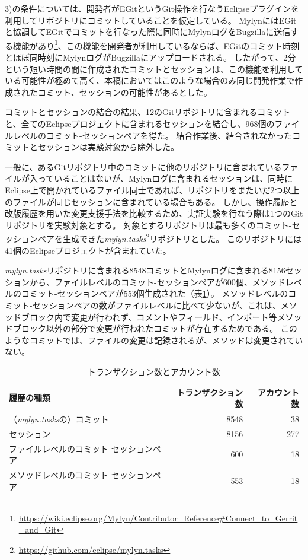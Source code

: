 \documentclass[a4paper]{jsbook}
\begin{document}
3)の条件については、開発者がEGitというGit操作を行なうEclipseプラグインを利用してリポジトリにコミットしていることを仮定している。
MylynにはEGitと協調してEGitでコミットを行なった際に同時にMylynログをBugzillaに送信する機能があり\footnote{\url{https://wiki.eclipse.org/Mylyn/Contributor_Reference\#Connect_to_Gerrit_and_Git}}、この機能を開発者が利用しているならば、EGitのコミット時刻とほぼ同時刻にMylynログがBugzillaにアップロードされる。
したがって、2分という短い時間の間に作成されたコミットとセッションは、この機能を利用している可能性が極めて高く、本稿においてはこのような場合のみ同じ開発作業で作成されたコミット、セッションの可能性があるとした。

コミットとセッションの結合の結果、12のGitリポジトリに含まれるコミットと、全てのEclipseプロジェクトに含まれるセッションを結合し、968個のファイルレベルのコミット-セッションペアを得た。
結合作業後、結合されなかったコミットとセッションは実験対象から除外した。

一般に、あるGitリポジトリ中のコミットに他のリポジトリに含まれているファイルが入っていることはないが、Mylynログに含まれるセッションは、同時にEclipse上で開かれているファイル同士であれば、リポジトリをまたいだ2つ以上のファイルが同じセッションに含まれている場合もある。
しかし、操作履歴と改版履歴を用いた変更支援手法を比較するため、実証実験を行なう際は1つのGitリポジトリを実験対象とする。
対象とするリポジトリは最も多くのコミット-セッションペアを生成できた{\it mylyn.tasks}\footnote{\url{https://github.com/eclipse/mylyn.tasks}}リポジトリとした。
このリポジトリには41個のEclipseプロジェクトが含まれていた。

{\it mylyn.tasks}リポジトリに含まれる8548コミットとMylynログに含まれる8156セッションから、ファイルレベルのコミット-セッションペアが600個、メソッドレベルのコミット-セッションペアが553個生成された（表\ref{transaction}）。
メソッドレベルのコミット-セッションペアの数がファイルレベルに比べて少ないが、これは、メソッドブロック内で変更が行われず、コメントやフィールド、インポート等メソッドブロック以外の部分で変更が行われたコミットが存在するためである。
このようなコミットでは、ファイルの変更は記録されるが、メソッドは変更されていない。
\begin{table}[tb]
  \begin{center}
    \caption{トランザクション数とアカウント数}
\label{transaction}
\begin{tabular}{lrr}
  \hline
  履歴の種類 & トランザクション数 & アカウント数\\
  \hline
  （{\it mylyn.tasks}の）コミット & 8548 &38\\
  セッション & 8156 &277\\
  \hline
  ファイルレベルのコミット-セッションペア & 600 & 18\\
  メソッドレベルのコミット-セッションペア & 553 & 18\\
  \hline
\end{tabular}
  \end{center}
\end{table}
\end{document}
